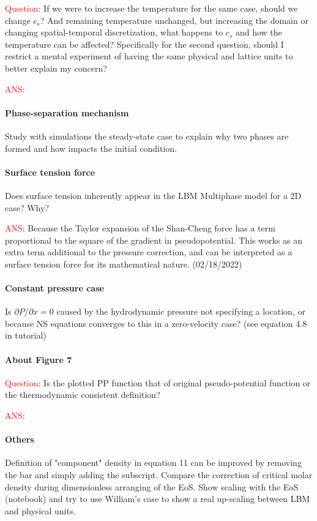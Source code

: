 \documentclass{article}
\begin{document}
	\textcolor{red}{Question}: If we were to increase the temperature for the same case, should we change $c_s$? And remaining temperature unchanged, but increasing the domain or changing spatial-temporal discretization, what happens to $c_s$ and how the temperature can be affected? Specifically for the second question, should I restrict a mental experiment of having the same physical and lattice units to better explain my concern?

	\textcolor{red}{ANS}:
	
	\paragraph{Phase-separation mechanism} Study with simulations the steady-state case to explain why two phases are formed and how impacts the initial condition.
	
	\paragraph{Surface tension force} Does surface tension inherently appear in the LBM Multiphase model for a 2D case? Why?
	
	\textcolor{red}{ANS}: Because the Taylor expansion of the Shan-Cheng force has a term proportional to the square of the gradient in pseudopotential. This works as an extra term additional to the pressure correction, and can be interpreted as a surface tension force for its mathematical nature. (02/18/2022)
	
	\paragraph{Constant pressure case} Is $\partial P/\partial x=0$ caused by the hydrodynamic pressure not specifying a location, or because NS equations converges to this in a zero-velocity case? (see equation 4.8 in tutorial)
	
	\paragraph{About Figure 7} \textcolor{red}{Question}: Is the plotted PP function that of original pseudo-potential function or the thermodynamic consistent definition?
	
	\textcolor{red}{ANS}:
	
	\paragraph{Others} Definition of "component" density in equation 11 can be improved by removing the bar and simply adding the subscript. Compare the correction of critical molar density during dimensionless arranging of the EoS. Show scaling with the EoS (notebook) and try to use William's case to show a real up-scaling between LBM and physical units.
	
\end{document}
